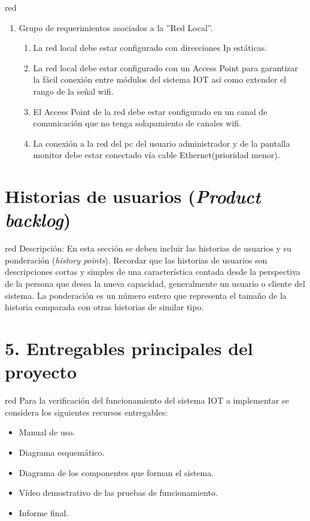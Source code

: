 \documentclass[11pt]{charter}
\begin{document}
\begin{consigna}{red}
\begin{enumerate}
\item Grupo de requerimientos asociados a la ''Red Local''.
	\begin{enumerate}
	\item La red local debe estar configurado con direcciones Ip estáticas.
	\item La red local debe estar configurado con un Access Point para garantizar la fácil conexión entre módulos del sistema IOT así como extender el rango de la señal wifi.
	\item El Access Point de la red debe estar configurado en un canal de comunicación que no tenga solapamiento de canales wifi.
	\item La conexión a la red del pc del usuario administrador y de la pantalla monitor debe estar conectado vía cable Ethernet(prioridad menor).
	\end{enumerate}

\end{enumerate}

\end{consigna}

\section{Historias de usuarios (\textit{Product backlog})}
\label{sec:backlog}

\begin{consigna}{red}
Descripción: En esta sección se deben incluir las historias de usuarios y su ponderación (\textit{history points}). Recordar que las historias de usuarios son descripciones cortas y simples de una característica contada desde la perspectiva de la persona que desea la nueva capacidad, generalmente un usuario o cliente del sistema. La ponderación es un número entero que representa el tamaño de la historia comparada con otras historias de similar tipo.
\end{consigna}

\section{5. Entregables principales del proyecto}
\label{sec:entregables}

\begin{consigna}{red}
Para la verificación del funcionamiento del sistema IOT a implementar se considera los siguientes recursos entregables:
\begin{itemize}
\item Manual de uso.
\item Diagrama esquemático.
\item Diagrama de los componentes que forman el sistema.
\item Vídeo demostrativo de las pruebas de funcionamiento.
\item Informe final.

\end{itemize}

\end{consigna}
\end{document}
